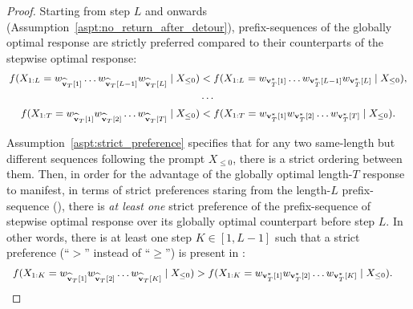 \begin{proof}
    Starting from step $L$ and onwards (Assumption~\ref{aspt:no_return_after_detour}), prefix-sequences of the globally optimal response are strictly preferred compared to their counterparts of the stepwise optimal response:
    \begin{equation}\label{equ:after_manifest}
        \small
        \begin{split}
            f(X_{1:L} = w_{\widehat{\mathbf{v}}_T[1]} \ldots w_{\widehat{\mathbf{v}}_T[L - 1]} w_{\widehat{\mathbf{v}}_T[L]} \mid X_{\leq 0})
             & < f(X_{1:L} = w_{\mathbf{v}_T^*[1]} \ldots w_{\mathbf{v}_T^*[L - 1]} w_{\mathbf{v}_T^*[L]} \mid X_{\leq 0}), \\
             & \cdots                                                                                     \\
            f(X_{1:T} = w_{\widehat{\mathbf{v}}_T[1]} w_{\widehat{\mathbf{v}}_T[2]} \ldots w_{\widehat{\mathbf{v}}_T[T]} \mid X_{\leq 0})
             & < f(X_{1:T} = w_{\mathbf{v}_T^*[1]} w_{\mathbf{v}_T^*[2]} \ldots w_{\mathbf{v}_T^*[T]} \mid X_{\leq 0}).
        \end{split}
    \end{equation}

    Assumption~\ref{aspt:strict_preference} specifies that for any two same-length but different sequences following the prompt $X_{\leq 0}$, there is a strict ordering between them.
    Then, in order for the advantage of the globally optimal length-$T$ response to manifest, in terms of strict preferences staring from the length-$L$ prefix-sequence (), there is \emph{at least one} strict preference of the prefix-sequence of stepwise optimal response over its globally optimal counterpart before step $L$.
    In other words, there is at least one step $K \in [1, L-1]$ such that a strict preference (``$>$'' instead of ``$\geq$'') is present in :
    \begin{equation}\label{equ:step_of_strict_preference}
        \small
        \begin{split}
            f(X_{1:K} = w_{\widehat{\mathbf{v}}_T[1]} w_{\widehat{\mathbf{v}}_T[2]} \ldots w_{\widehat{\mathbf{v}}_T[K]} \mid X_{\leq 0})
             & > f(X_{1:K} = w_{\mathbf{v}_T^*[1]} w_{\mathbf{v}_T^*[2]} \ldots w_{\mathbf{v}_T^*[K]} \mid X_{\leq 0}).
        \end{split}
    \end{equation}


\end{proof}
